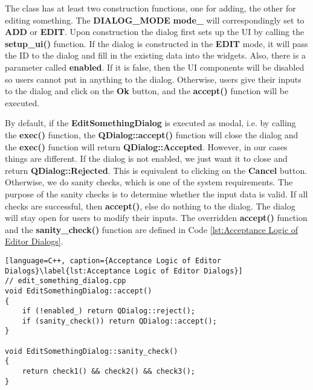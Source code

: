 The class has at least two construction functions, one for adding, the other for editing something. The \textbf{DIALOG\_MODE} \textbf{mode\_} will correspondingly set to \textbf{ADD} or \textbf{EDIT}. Upon construction the dialog first sets up the UI by calling the \textbf{setup\_ui()} function. If the dialog is constructed in the \textbf{EDIT} mode, it will pass the ID to the dialog and fill in the existing data into the widgets. Also, there is a parameter called \textbf{enabled}. If it is false, then the UI components will be disabled so users cannot put in anything to the dialog. Otherwise, users give their inputs to the dialog and click on the \textbf{Ok} button, and the \textbf{accept()} function will be executed. 

By default, if the \textbf{EditSomethingDialog} is executed as modal, i.e. by calling the \textbf{exec()} function, the \textbf{QDialog::accept()} function will close the dialog and the \textbf{exec()} function will return \textbf{QDialog::Accepted}. However, in our cases things are different. If the dialog is not enabled, we just want it to close and return \textbf{QDialog::Rejected}. This is equivalent to clicking on the \textbf{Cancel} button. Otherwise, we do sanity checks, which is one of the system requirements. The purpose of the sanity checks is to determine whether the input data is valid. If all checks are successful, then \textbf{accept()}, else do nothing to the dialog. The dialog will stay open for users to modify their inputs. The overridden \textbf{accept()} function and the \textbf{sanity\_check()} function are defined in Code \ref{lst:Acceptance Logic of Editor Dialogs}.

\begin{lstlisting}[language=C++, caption={Acceptance Logic of Editor Dialogs}\label{lst:Acceptance Logic of Editor Dialogs}]
// edit_something_dialog.cpp
void EditSomethingDialog::accept()
{
    if (!enabled_) return QDialog::reject();
    if (sanity_check()) return QDialog::accept();
}

void EditSomethingDialog::sanity_check()
{
    return check1() && check2() && check3();
}
\end{lstlisting}

